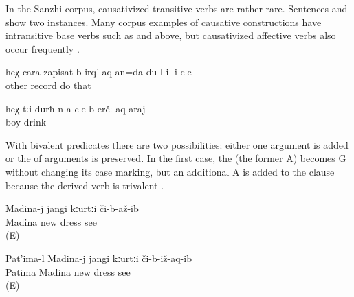 In the Sanzhi corpus, causativized transitive verbs are rather rare. Sentences  and  show two instances. Many corpus examples of causative constructions have intransitive base verbs such as  and  above, but causativized affective verbs also occur frequently .

\begin{exe}
	\ex	\label{ex:‎‎If it is like this, I will also make him record that other (story)}
	\gll	heχ	cara	zapisat	b-irq'-aq-an=da	du-l	il-i-cːe\\
			other	record	do	 that\\
	\glt	{}

	\ex	\label{ex:to make the boys drink}
	\gll	heχ-tːi	durħ-n-a-cːe	b-erčː-aq-araj\\
			boy	drink\\
	\glt	{}
\end{exe}

With bivalent  predicates there are two possibilities: either one argument is added or the  of arguments is preserved. In the first case, the  (the former A) becomes G without changing its case marking, but an additional A is added to the clause because the derived verb is trivalent . 

\begin{exe}
	\ex	\label{ex:Madina, Patima, and the dress@59}
	\begin{xlist}
		\ex	\label{ex:Madina saw a new dress@59a}
		\gll	Madina-j	jangi	kːurtːi	či-b-až-ib\\
			Madina	new	dress	see\\
		\glt	{} (E)

		\ex	\label{ex:Patima showed Madina a new dress@59b}
		\gll	Pat'ima-l	Madina-j	jangi	kːurtːi	či-b-iž-aq-ib\\
			Patima	Madina	new	dress	see\\
		\glt	{} (E)
	\end{xlist}
\end{exe}

